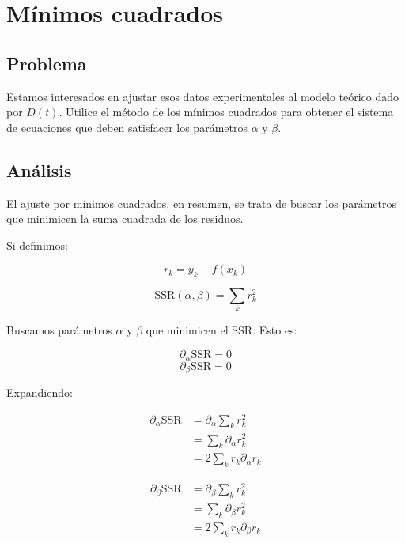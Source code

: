 \section{Mínimos cuadrados}

\subsection{Problema}

Estamos interesados en ajustar esos datos experimentales al modelo teórico
dado por $D(t)$. Utilice el método de los mínimos cuadrados para obtener el sistema
de ecuaciones que deben satisfacer los parámetros $\alpha$ y $\beta$.

\subsection{Análisis}

El ajuste por mínimos cuadrados, en resumen, se trata de buscar los parámetros que minimicen la suma cuadrada de los residuos. 

Si definimos:

\begin{equation}
	r_k = y_k - f(x_k)
\end{equation}

\begin{equation}
	\text{SSR}(\alpha, \beta) = \sum_{k} r_k^2 
\end{equation}

Buscamos parámetros $\alpha$ y $\beta$ que minimicen el SSR. Esto es:

\begin{equation}
	\partial_\alpha \text{SSR} = 0
\end{equation}
\begin{equation}
	\partial_\beta \text{SSR} = 0
\end{equation}

Expandiendo:

\begin{align*}
	\partial_\alpha \text{SSR} &= \partial_\alpha \sum_{k} r_k^2 \\
	&= \sum_{k} \partial_\alpha r_k^2 \\
	&= 2 \sum_{k} r_k  \partial_\alpha r_k 
\end{align*} 

\begin{align*}
	\partial_\beta \text{SSR} &= \partial_\beta \sum_{k} r_k^2 \\
	&= \sum_{k} \partial_\beta r_k^2 \\
	&= 2 \sum_{k} r_k \partial_\beta r_k 
\end{align*} 

